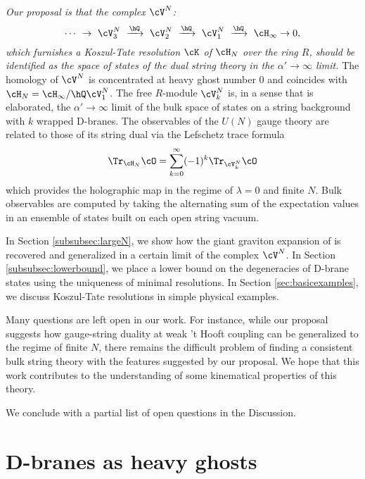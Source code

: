 \documentclass[a4paper,12pt]{article}
\begin{document}
\textit{Our proposal is that the complex $\cV^N$:}
\begin{equation}
\cdots \ \rightarrow \ \cV_3^{N} \ \xrightarrow{\hQ} \ \cV_2^{N} \ \xrightarrow{\hQ} \ \cV_1^{N} \ \xrightarrow{\hQ} \ \cH_\infty \rightarrow 0,
\end{equation}
\textit{which furnishes a Koszul-Tate resolution $\cK$ of $\cH_N$ over the ring $R$, should be identified as the space of states of the dual string theory in the $\alpha' \to \infty$ limit.} The homology of $\cV^N$ is concentrated at heavy ghost number $0$ and coincides with $\cH_N = \cH_\infty / \hQ \cV_1^N$. The free $R$-module $\cV_k^N$ is, in a sense that is elaborated, the $\alpha' \to \infty$ limit of the bulk space of states on a string background with $k$ wrapped D-branes. The observables of the $U(N)$ gauge theory are related to those of its string dual via the Lefschetz trace formula
\begin{equation}
\Tr_{\cH_N} \cO = \sum_{k=0}^\infty (-1)^k \Tr_{\cV_k^N} \cO
\end{equation}
which provides the holographic map in the regime of $\lambda = 0$ and finite $N$. Bulk observables are computed by taking the alternating sum of the expectation values in an ensemble of states built on each open string vacuum.

In Section \ref{subsubsec:largeN}, we show how the giant graviton expansion of \cite{Gaiotto:2021xce} is recovered and generalized in a certain limit of the complex $\cV^N$. In Section \ref{subsubsec:lowerbound}, we place a lower bound on the degeneracies of D-brane states using the uniqueness of minimal resolutions. In Section \ref{sec:basicexamples}, we discuss Koszul-Tate resolutions in simple physical examples.

Many questions are left open in our work. For instance, while our proposal suggests how gauge-string duality at weak 't Hooft coupling can be generalized to the regime of finite $N$, there remains the difficult problem of finding a consistent bulk string theory with the features suggested by our proposal. We hope that this work contributes to the understanding of some kinematical properties of this theory.

We conclude with a partial list of open questions in the Discussion.

\section{D-branes as heavy ghosts} \label{sec:dbraneghost}
\end{document}
